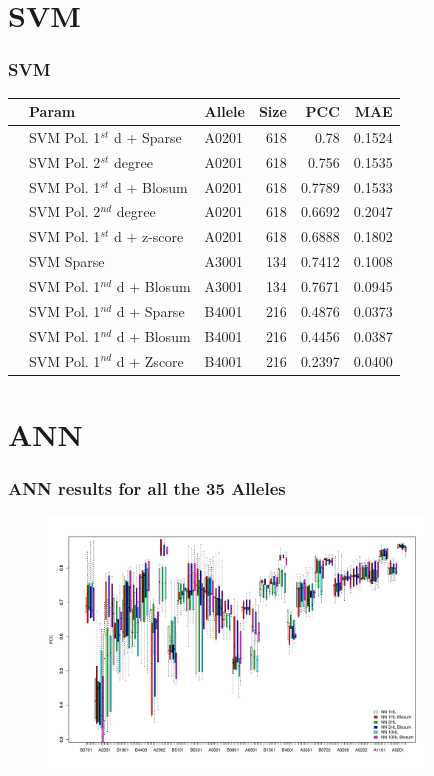 \documentclass[presentation]{beamer}   %
\begin{document}
\section{SVM}
 \frametitle{SVM}
\begin{frame}
\begin{table}[ht]\scriptsize
\begin{center}
\begin{tabular}{rllrrr}
  \hline
 & Param & Allele & Size & PCC & MAE \\ 
  \hline
 & SVM Pol. 1$^{st}$ d + Sparse & A0201 &   618 & 0.78 & 0.1524 \\ 
 & SVM Pol. 2$^{st}$ degree & A0201 &   618 & 0.756 & 0.1535 \\ 
 & SVM Pol. 1$^{st}$ d + Blosum & A0201 &   618 & 0.7789 & 0.1533 \\ 
 & SVM Pol. 2$^{nd}$ degree & A0201 &   618 & 0.6692 & 0.2047 \\ 
 & SVM Pol. 1$^{st}$ d + z-score & A0201 &   618 & 0.6888 & 0.1802 \\ 
 & SVM Sparse & A3001 &   134 & 0.7412 & 0.1008 \\ 
 & SVM Pol. 1$^{nd}$ d + Blosum & A3001 &   134 & 0.7671 & 0.0945 \\ 
 & SVM Pol. 1$^{nd}$ d + Sparse & B4001 &   216 & 0.4876 & 0.0373 \\ 
 & SVM Pol. 1$^{nd}$ d + Blosum & B4001 &   216 & 0.4456 & 0.0387 \\ 
 & SVM Pol. 1$^{nd}$ d + Zscore & B4001 &   216 & 0.2397 & 0.0400 \\ 
   \hline
\end{tabular}
\end{center}
\end{table}

\end{frame}

\section{ANN}

\begin{frame}
\frametitle{ANN results for all the 35 Alleles}
\begin{figure}[ht]
\begin{center}
\includegraphics[width=10cm]{fig/annBX1.pdf}
\end{center}
\end{figure}
\end{frame}
\end{document}
